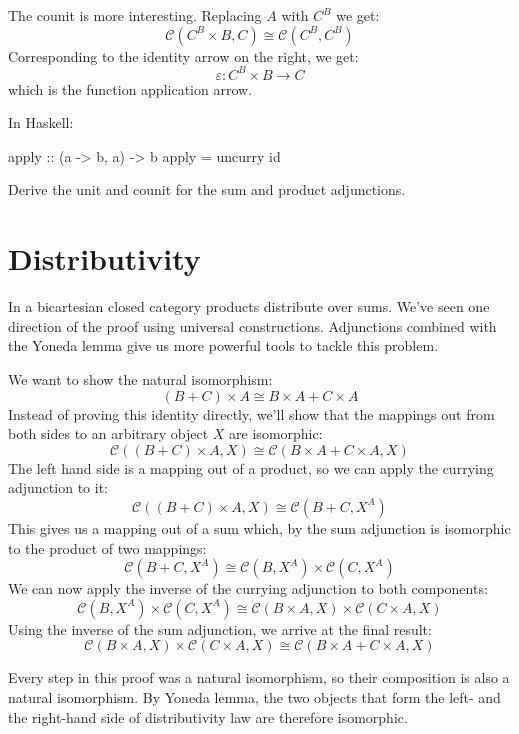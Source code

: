 \documentclass[DaoFP]{subfiles}
\begin{document}
The counit is more interesting. Replacing $A$ with $C^B$ we get:
\[  \mathcal{C}(C^B \times B, C ) \cong  \mathcal{C} (C^B, C^B)  \]
Corresponding to the identity arrow on the right, we get:
\[ \varepsilon \colon C^B \times B \to C \]
which is the function application arrow. 

In Haskell:
\begin{haskell}
apply :: (a -> b, a) -> b
apply = uncurry id
\end{haskell}

\begin{exercise}
Derive the unit and counit for the sum and product adjunctions.
\end{exercise}

\section{Distributivity}

In a bicartesian closed category products distribute over sums. We've seen one direction of the proof using universal constructions. Adjunctions combined with the Yoneda lemma give us more powerful tools to tackle this problem.

We want to show the natural isomorphism:
\[(B + C) \times A \cong B \times A + C \times A \]
Instead of proving this identity directly, we'll show that the mappings out from both sides to an arbitrary object $X$ are isomorphic:
\[  \mathcal{C} ((B + C) \times A, X) \cong \mathcal{C}(B \times A + C \times A, X) \]
The left hand side is a mapping out of a product, so we can apply the currying adjunction to it:
\[  \mathcal{C} ((B + C) \times A, X) \cong \mathcal{C}(B + C, X^A) \]
This gives us a mapping out of a sum which, by the sum adjunction is isomorphic to the product of two mappings:
\[  \mathcal{C}(B + C, X^A) \cong \mathcal{C}(B, X^A) \times \mathcal{C}(C, X^A)\]
We can now apply the inverse of the currying adjunction to both components:
\[  \mathcal{C}(B, X^A) \times \mathcal{C}(C, X^A) \cong \mathcal{C}(B \times A, X) \times \mathcal{C}(C \times A, X)\]
Using the inverse of the sum adjunction, we arrive at the final result:
\[ \mathcal{C}(B \times A, X) \times \mathcal{C}(C \times A, X) \cong \mathcal{C}(B \times A + C \times A, X) \]

Every step in this proof was a natural isomorphism, so their composition is also a natural isomorphism. By Yoneda lemma, the two objects that form the left- and the right-hand side of distributivity law are therefore isomorphic.
\end{document}
